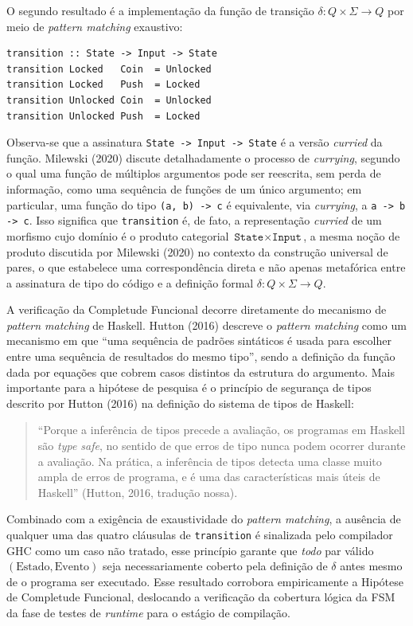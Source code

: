 \documentclass[12pt,a4paper]{article}
\begin{document}
O segundo resultado é a implementação da função de transição $\delta: Q \times \Sigma \to Q$ por meio de \textit{pattern matching} exaustivo:

\begin{verbatim}
transition :: State -> Input -> State
transition Locked   Coin  = Unlocked
transition Locked   Push  = Locked
transition Unlocked Coin  = Unlocked
transition Unlocked Push  = Locked
\end{verbatim}

Observa-se que a assinatura \texttt{State -> Input -> State} é a versão \textit{curried} da função. Milewski (2020) discute detalhadamente o processo de \textit{currying}, segundo o qual uma função de múltiplos argumentos pode ser reescrita, sem perda de informação, como uma sequência de funções de um único argumento; em particular, uma função do tipo \texttt{(a, b) -> c} é equivalente, via \textit{currying}, a \texttt{a -> b -> c}. Isso significa que \texttt{transition} é, de fato, a representação \textit{curried} de um morfismo cujo domínio é o produto categorial $\texttt{State} \times \texttt{Input}$, a mesma noção de produto discutida por Milewski (2020) no contexto da construção universal de pares, o que estabelece uma correspondência direta e não apenas metafórica entre a assinatura de tipo do código e a definição formal $\delta: Q \times \Sigma \to Q$.

A verificação da Completude Funcional decorre diretamente do mecanismo de \textit{pattern matching} de Haskell. Hutton (2016) descreve o \textit{pattern matching} como um mecanismo em que ``uma sequência de padrões sintáticos é usada para escolher entre uma sequência de resultados do mesmo tipo'', sendo a definição da função dada por equações que cobrem casos distintos da estrutura do argumento. Mais importante para a hipótese de pesquisa é o princípio de segurança de tipos descrito por Hutton (2016) na definição do sistema de tipos de Haskell:

\begin{quote}
``Porque a inferência de tipos precede a avaliação, os programas em Haskell são \textit{type safe}, no sentido de que erros de tipo nunca podem ocorrer durante a avaliação. Na prática, a inferência de tipos detecta uma classe muito ampla de erros de programa, e é uma das características mais úteis de Haskell'' (Hutton, 2016, tradução nossa).
\end{quote}

Combinado com a exigência de exaustividade do \textit{pattern matching}, a ausência de qualquer uma das quatro cláusulas de \texttt{transition} é sinalizada pelo compilador GHC como um caso não tratado, esse princípio garante que \emph{todo} par válido $(\text{Estado}, \text{Evento})$ seja necessariamente coberto pela definição de $\delta$ antes mesmo de o programa ser executado. Esse resultado corrobora empiricamente a Hipótese de Completude Funcional, deslocando a verificação da cobertura lógica da FSM da fase de testes de \textit{runtime} para o estágio de compilação.
\end{document}
